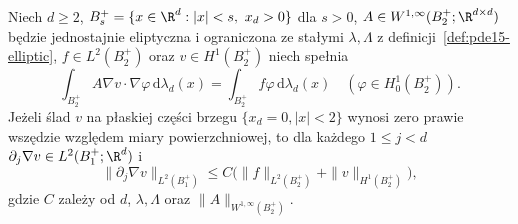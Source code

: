 \begin{lemat}
\label{lem:pde15-tangential}
Niech $d\ge2$, $B_s^+=\{x\in\R^d:|x|<s,\ x_d>0\}$ dla $s>0$,
$A\in W^{1,\infty}(B_2^+;\R^{d\times d})$ będzie
jednostajnie eliptyczna i ograniczona ze stałymi
$\lambda,\Lambda$ z definicji~\ref{def:pde15-elliptic},
$f\in L^2(B_2^+)$ oraz $v\in H^1(B_2^+)$ niech spełnia
\[
 \int_{B_2^+}A\nabla v\cdot\nabla\varphi\,\mathrm d\lambda_d(x)
 =\int_{B_2^+}f\varphi\,\mathrm d\lambda_d(x)
 \quad(\varphi\in H_0^1(B_2^+)).
\]
Jeżeli ślad $v$ na płaskiej części brzegu
$\{x_d=0,|x|<2\}$ wynosi zero prawie wszędzie
względem miary powierzchniowej, to dla każdego $1\le j<d$
$\partial_j\nabla v\in L^2(B_1^+;\R^d)$ i
\[
 \|\partial_j\nabla v\|_{L^2(B_1^+)}
 \le C\bigl(\|f\|_{L^2(B_2^+)}+\|v\|_{H^1(B_2^+)}\bigr),
\]
gdzie $C$ zależy od $d$, $\lambda,\Lambda$ oraz
$\|A\|_{W^{1,\infty}(B_2^+)}$.
\end{lemat}
